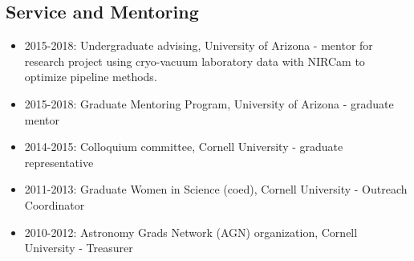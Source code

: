 \documentclass[11pt, oneside]{article}   	%
\begin{document}
\subsection*{Service and Mentoring}
\begin{itemize}[noitemsep]
    \item 2015-2018: Undergraduate advising, University of Arizona - mentor for research project using cryo-vacuum laboratory data with NIRCam to optimize pipeline methods.
    \item 2015-2018: Graduate Mentoring Program, University of Arizona - graduate mentor
    \item 2014-2015: Colloquium committee, Cornell University - graduate representative
    \item 2011-2013: Graduate Women in Science (coed), Cornell University - Outreach Coordinator
    \item2010-2012: Astronomy Grads Network (AGN) organization, Cornell University - Treasurer
\end{itemize}


\end{document}
